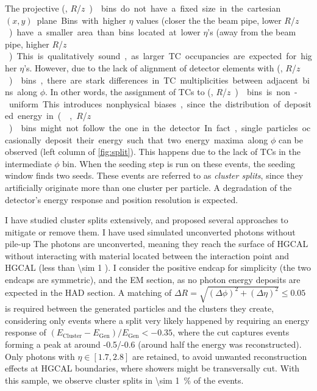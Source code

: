 \documentclass[11pt]{article}
\newcommand{\azimuth}{$\phi$}
\newcommand{\coordsa}{(\si{\azi}, \si{\rz})}
\newcommand{\rapidity}{$\eta$}
\newcommand{\rz}{$R$/$z$}
\begin{document}
The projective \coordsa{} bins do not have a fixed size in the cartesian \((x,y)\) plane.
Bins with higher \rapidity{} values (closer the the beam pipe, lower \si{\rz}) have a smaller area than bins located at lower \rapidity{}'s (away from the beam pipe, higher \si{\rz}).
This is qualitatively sound, as larger \ac{TC} occupancies are expected for higher \rapidity{}'s.
However, due to the lack of alignment of detector elements with \coordsa{} bins, there are stark differences in \ac{TC} multiplicities between adjacent bins along \azimuth{}.
In other words, the assignment of \acp{TC} to \coordsa{} bins is non-uniform.
This introduces nonphysical biases, since the distribution of deposited energy in \coordsa{} bins might not follow the one in the detector.
In fact, single particles occasionally deposit their energy such that two energy maxima along \azimuth{} can be observed (left column of \cref{fig:split}).
This happens due to the lack of \acp{TC} in the intermediate \azimuth{} bin.
When the seeding step is run on these events, the seeding window finds two seeds.
These events are referred to as \emph{cluster splits}, since they artificially originate more than one cluster per particle.
A degradation of the detector's energy response and position resolution is expected.

I have studied cluster splits extensively, and proposed several approaches to mitigate or remove them.
I have used simulated unconverted photons without pile-up
The photons are unconverted, meaning they reach the surface of \ac{HGCAL} without interacting with material located between the interaction point and \ac{HGCAL} (less than \SI{\sim 1}{\radl} \cite{hgcal_web}).
I consider the positive endcap for simplicity (the two endcaps are symmetric), and the \ac{EM} section, as no photon energy deposits are expected in the \ac{HAD} section.
A matching of \(\Delta R = \sqrt{(\Delta \phi)^{2} + (\Delta \eta)^{2}} \leq 0.05\) is required between the generated particles and the clusters they create, considering only events where a split very likely happened by requiring an energy response of \((E_{\text{Cluster}}-E_{\text{Gen}})/E_{\text{Gen}} < -0.35\), where the cut captures events forming a peak at around -0.5/-0.6 (around half the energy was reconstructed).
Only photons with \(\eta \in \left[1.7, 2.8\right]\) are retained, to avoid unwanted reconstruction effects at \ac{HGCAL} boundaries, where showers might be transversally cut.
With this sample, we observe cluster splits in \SI{\sim 1}{\percent} of the events.
\end{document}
